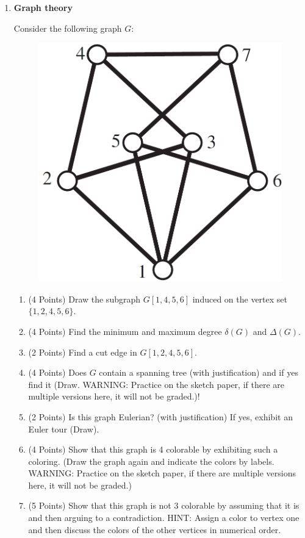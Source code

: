 \documentclass[12pt]{article}
\begin{document}
\begin{enumerate}
\newpage
\item \textbf{Graph theory}

Consider the following graph $G$:

\begin{figure}[h]
\centering
\includegraphics[scale=0.3]{Euler.png}
\end{figure}

\begin{enumerate}
\item (4 Points) Draw the subgraph $G[1,4,5,6]$ induced on the vertex set $\{1,2,4,5,6\}$.\vspace{3cm}
\item (4 Points) Find the minimum and maximum degree $\delta(G)$ and $\Delta(G)$.\vspace{2cm}
\item (2 Points) Find a cut edge in $G[1,2,4,5,6]$.\vspace{2cm}
\item (4 Points) Does $G$ contain a spanning tree (with justification) and if yes find it (Draw. WARNING: Practice on the sketch paper, if there are multiple versions here, it will not be graded.)!\vspace{5cm}
\item (2 Points) Is this graph Eulerian? (with justification) If yes, exhibit an Euler tour (Draw).\vspace{5cm}
\item (4 Points) Show that this graph is 4 colorable by exhibiting such a coloring. (Draw the graph again and indicate the colors by labels. WARNING: Practice on the sketch paper, if there are multiple versions here, it will not be graded.)\vspace{5cm} 
\item (5 Points) Show that this graph is not $3$ colorable by assuming that it is and then arguing to a contradiction. HINT: Assign a color to vertex one and then discuss the colors of the other vertices in numerical order.


\end{enumerate}
\end{enumerate}
\end{document}
